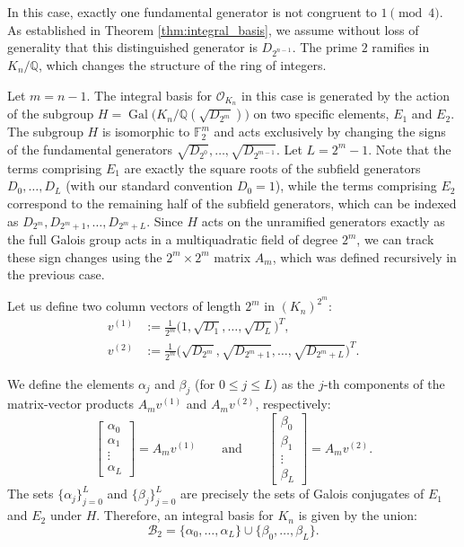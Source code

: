 \documentclass{amsart}
\newcommand{\Q}{\mathbb{Q}}
\newcommand{\F}{\mathbb{F}}
\theoremstyle{plain}
\theoremstyle{definition}
\theoremstyle{remark}
\numberwithin{equation}{section}
\begin{document}
In this case, exactly one fundamental generator is not congruent to $1 \pmod 4$. As established in Theorem \ref{thm:integral_basis}, we assume without loss of generality that this distinguished generator is $D_{2^{n-1}}$. The prime $2$ ramifies in $K_n/\Q$, which changes the structure of the ring of integers. 

Let $m = n - 1$. The integral basis for $\mathcal{O}_{K_n}$ in this case is generated by the action of the subgroup $H = \operatorname{Gal}\bigl(K_n/\Q(\sqrt{D_{2^m}})\bigr)$ on two specific elements, $E_1$ and $E_2$. The subgroup $H$ is isomorphic to $\F_2^m$ and acts exclusively by changing the signs of the fundamental generators $\sqrt{D_{2^0}}, \ldots, \sqrt{D_{2^{m-1}}}$. Let $L = 2^m - 1$. Note that the terms comprising $E_1$ are exactly the square roots of the subfield generators $D_0, \ldots, D_L$ (with our standard convention $D_0 = 1$), while the terms comprising $E_2$ correspond to the remaining half of the subfield generators, which can be indexed as $D_{2^m}, D_{2^m+1}, \ldots, D_{2^m+L}$. Since $H$ acts on the unramified generators exactly as the full Galois group acts in a multiquadratic field of degree $2^m$, we can  track these sign changes using the $2^m \times 2^m$ matrix $A_m$, which was defined recursively in the previous case. 

Let us define two column vectors of length $2^m$ in $(K_n)^{2^m}$:
\begin{align*}
    v^{(1)} &:= \frac{1}{2^m}\bigl(1, \sqrt{D_1}, \ldots, \sqrt{D_L}\bigr)^T, \\
    v^{(2)} &:= \frac{1}{2^m}\bigl(\sqrt{D_{2^m}}, \sqrt{D_{2^m+1}}, \ldots, \sqrt{D_{2^m+L}}\bigr)^T.
\end{align*}

We define the elements $\alpha_j$ and $\beta_j$ (for $0 \leq j \leq L$) as the $j$-th components of the matrix-vector products $A_m v^{(1)}$ and $A_m v^{(2)}$, respectively:
\[
    \begin{bmatrix} \alpha_0 \\ \alpha_1 \\ \vdots \\ \alpha_L \end{bmatrix} = A_m v^{(1)} 
    \qquad \text{and} \qquad 
    \begin{bmatrix} \beta_0 \\ \beta_1 \\ \vdots \\ \beta_L \end{bmatrix} = A_m v^{(2)}.
\]
The sets $\{\alpha_j\}_{j=0}^L$ and $\{\beta_j\}_{j=0}^L$ are precisely the sets of Galois conjugates of $E_1$ and $E_2$ under $H$. Therefore, an  integral basis for $K_n$ is given by the union:
\[
    \mathcal{B}_2 = \{\alpha_0, \ldots, \alpha_L\} \cup \{\beta_0, \ldots, \beta_L\}.
\]
\end{document}

